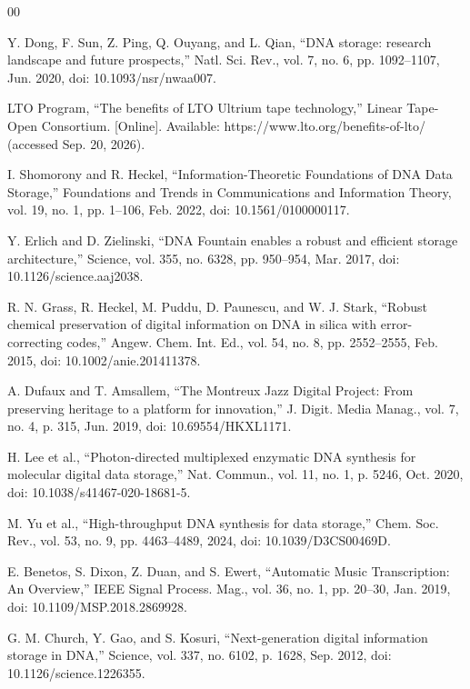 \documentclass[conference]{IEEEtran}
\begin{document}
\begin{thebibliography}{00}

 Y. Dong, F. Sun, Z. Ping, Q. Ouyang, and L. Qian, ``DNA storage: research landscape and future prospects,'' Natl. Sci. Rev., vol. 7, no. 6, pp. 1092--1107, Jun. 2020, doi: 10.1093/nsr/nwaa007.

 LTO Program, ``The benefits of LTO Ultrium tape technology,'' Linear Tape-Open Consortium. [Online]. Available: https://www.lto.org/benefits-of-lto/ (accessed Sep. 20, 2026).

 I. Shomorony and R. Heckel, ``Information-Theoretic Foundations of DNA Data Storage,'' Foundations and Trends in Communications and Information Theory, vol. 19, no. 1, pp. 1--106, Feb. 2022, doi: 10.1561/0100000117.

 Y. Erlich and D. Zielinski, ``DNA Fountain enables a robust and efficient storage architecture,'' Science, vol. 355, no. 6328, pp. 950--954, Mar. 2017, doi: 10.1126/science.aaj2038.

 R. N. Grass, R. Heckel, M. Puddu, D. Paunescu, and W. J. Stark, ``Robust chemical preservation of digital information on DNA in silica with error-correcting codes,'' Angew. Chem. Int. Ed., vol. 54, no. 8, pp. 2552--2555, Feb. 2015, doi: 10.1002/anie.201411378.

 A. Dufaux and T. Amsallem, ``The Montreux Jazz Digital Project: From preserving heritage to a platform for innovation,'' J. Digit. Media Manag., vol. 7, no. 4, p. 315, Jun. 2019, doi: 10.69554/HKXL1171.

 H. Lee et al., ``Photon-directed multiplexed enzymatic DNA synthesis for molecular digital data storage,'' Nat. Commun., vol. 11, no. 1, p. 5246, Oct. 2020, doi: 10.1038/s41467-020-18681-5.

 M. Yu et al., ``High-throughput DNA synthesis for data storage,'' Chem. Soc. Rev., vol. 53, no. 9, pp. 4463--4489, 2024, doi: 10.1039/D3CS00469D.

 E. Benetos, S. Dixon, Z. Duan, and S. Ewert, ``Automatic Music Transcription: An Overview,'' IEEE Signal Process. Mag., vol. 36, no. 1, pp. 20--30, Jan. 2019, doi: 10.1109/MSP.2018.2869928.

 G. M. Church, Y. Gao, and S. Kosuri, ``Next-generation digital information storage in DNA,'' Science, vol. 337, no. 6102, p. 1628, Sep. 2012, doi: 10.1126/science.1226355.


\end{thebibliography}
\end{document}
